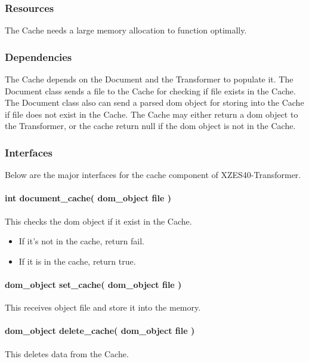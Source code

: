 \subsubsection{Resources}

The Cache needs a large memory allocation to function optimally.

\subsubsection{Dependencies}

The Cache depends on the Document and the Transformer to populate it.
The Document class sends a file to the Cache for checking if file exists in the Cache.
The Document class also can send a parsed \gls{dom} object for storing into the Cache if file does not exist in the Cache.
The Cache may either return a \gls{dom} object to the Transformer, or the cache return null if the \gls{dom} object is not in the Cache.

\subsubsection{Interfaces}

Below are the major interfaces for the cache component of XZES40-Transformer.

\paragraph{int document\_cache( dom\_object file )} 
This checks the \gls{dom} object if it exist in the Cache.

\begin{itemize}
    \item If it's not in the cache, return fail. 
    \item If it is in the cache, return true.
\end{itemize}

\paragraph{dom\_object set\_cache( dom\_object file )} 
This receives object file and store it into the memory.

\paragraph{dom\_object delete\_cache( dom\_object file )}
This deletes data from the Cache.

